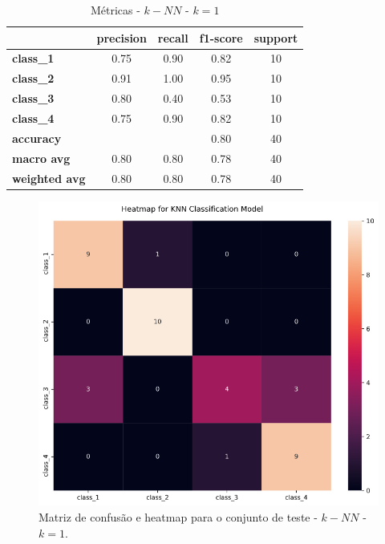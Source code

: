 \documentclass[
	article,			%
	11pt,				%
	oneside,			%
	a4paper,			%
	english,			%
	brazil,				%
	sumario=tradicional
	]{abntex2}
\begin{document}
\begin{table}[h!]
\centering
\begin{tabular}{l|c|c|c|c|}
\cline{2-5}
                                            & \multicolumn{1}{l|}{\textbf{precision}} & \textbf{recall} & \textbf{f1-score} & \textbf{support} \\ \hline
\multicolumn{1}{|l|}{\textbf{class\_1}}     & 0.75                                    & 0.90            & 0.82              & 10               \\ \hline
\multicolumn{1}{|l|}{\textbf{class\_2}}     & 0.91                                    & 1.00            & 0.95              & 10               \\ \hline
\multicolumn{1}{|l|}{\textbf{class\_3}}     & 0.80                                    & 0.40            & 0.53              & 10               \\ \hline
\multicolumn{1}{|l|}{\textbf{class\_4}}     & 0.75                                    & 0.90            & 0.82              & 10               \\ \hline
\multicolumn{1}{|l|}{\textbf{accuracy}}     &                                         &                 & 0.80              & 40               \\ \hline
\multicolumn{1}{|l|}{\textbf{macro avg}}    & 0.80                                    & 0.80            & 0.78              & 40               \\ \hline
\multicolumn{1}{|l|}{\textbf{weighted avg}} & 0.80                                    & 0.80            & 0.78              & 40               \\ \hline
\end{tabular}
\caption{Métricas - $k-NN$ - $k=1$}
\label{tab:knn_02}
\end{table}

\begin{figure}[h!]
 \centering
 \includegraphics[scale=0.35]{fig/knn_cm02.png}
 \caption{Matriz de confusão e heatmap para o conjunto de teste - $k-NN$ - $k=1$.}
 \label{fig:knn_cm02}
\end{figure}
\end{document}
